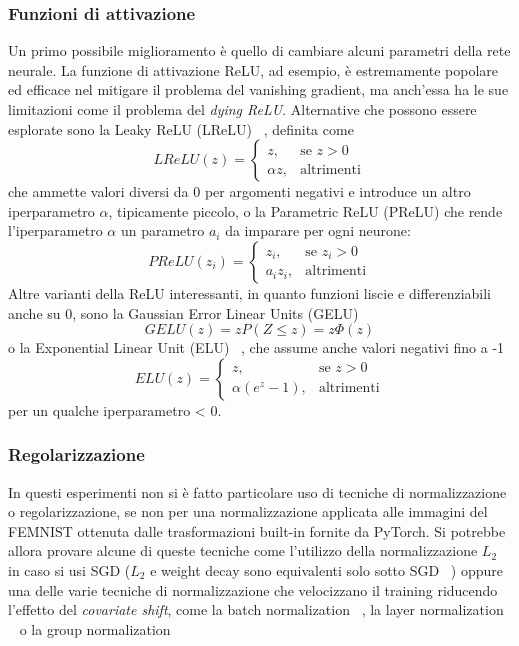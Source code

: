 \subsubsection{Funzioni di attivazione}
Un primo possibile miglioramento 
è quello di cambiare alcuni parametri 
della rete neurale.
La funzione di attivazione ReLU, ad esempio, è 
estremamente popolare ed efficace nel mitigare il problema del 
vanishing gradient, ma anch'essa ha le sue limitazioni come il 
problema del \textit{dying ReLU}. Alternative che possono essere 
esplorate sono la Leaky ReLU (LReLU) ~\cite{Maas2013RectifierNI},
definita come
\[
LReLU(z) = 
\begin{cases} 
      z, & \text{se } z > 0 \\
      \alpha z, & \text{altrimenti}
\end{cases}
\]
che ammette valori diversi da 0 per argomenti negativi e introduce un 
altro iperparametro \(\alpha\), tipicamente piccolo,
o la Parametric ReLU (PReLU) che rende l'iperparametro \(\alpha\)
un parametro \(a_i\) da imparare per ogni neurone:
\[
PReLU(z_i) = 
\begin{cases} 
      z_i, & \text{se } z_i > 0 \\
      a_i z_i, & \text{altrimenti}
\end{cases}
\]
Altre varianti della ReLU interessanti, in quanto funzioni liscie e 
differenziabili anche su 0, sono la Gaussian Error Linear Units (GELU)
~\cite{hendrycks2016gelu}
\[
GELU(z) = z P(Z \le z) = z \Phi(z)
\]
o la Exponential Linear Unit (ELU) ~\cite{clevert2016elu}, 
che assume anche valori negativi fino a -1
\[
ELU(z) = 
\begin{cases} 
      z, & \text{se } z > 0 \\
      \alpha (e^z - 1), & \text{altrimenti}
\end{cases}
\]
per un qualche iperparametro \alpha < 0.


\subsubsection{Regolarizzazione}
In questi esperimenti non si è fatto particolare uso di tecniche di 
normalizzazione o regolarizzazione, se non per una normalizzazione 
applicata alle immagini del FEMNIST ottenuta dalle trasformazioni 
built-in fornite da PyTorch. Si potrebbe allora provare alcune di 
queste tecniche come l'utilizzo della normalizzazione \(L_2\) in caso si 
usi SGD (\(L_2\) e weight decay sono equivalenti solo sotto SGD 
~\cite{Loshchilov2017AdamW}) oppure una delle varie tecniche di 
normalizzazione che velocizzano il training riducendo l'effetto del 
\textit{covariate shift}, come la batch normalization ~\cite{ioffe2015batch},
la layer normalization ~\cite{ba2016layer} o la group normalization 
~\cite{wu2018group}


